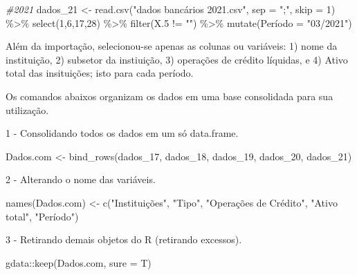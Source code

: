 \documentclass[
]{article}
\newenvironment{Shaded}{\begin{snugshade}}{\end{snugshade}}
\newcommand{\AttributeTok}[1]{\textcolor[rgb]{0.77,0.63,0.00}{#1}}
\newcommand{\CommentTok}[1]{\textcolor[rgb]{0.56,0.35,0.01}{\textit{#1}}}
\newcommand{\DecValTok}[1]{\textcolor[rgb]{0.00,0.00,0.81}{#1}}
\newcommand{\FloatTok}[1]{\textcolor[rgb]{0.00,0.00,0.81}{#1}}
\newcommand{\FunctionTok}[1]{\textcolor[rgb]{0.00,0.00,0.00}{#1}}
\newcommand{\NormalTok}[1]{#1}
\newcommand{\OtherTok}[1]{\textcolor[rgb]{0.56,0.35,0.01}{#1}}
\newcommand{\SpecialCharTok}[1]{\textcolor[rgb]{0.00,0.00,0.00}{#1}}
\newcommand{\StringTok}[1]{\textcolor[rgb]{0.31,0.60,0.02}{#1}}
\begin{document}
\begin{Shaded}
\begin{Highlighting}[]
\CommentTok{\#2021}
\NormalTok{dados\_21 }\OtherTok{\textless{}{-}} \FunctionTok{read.csv}\NormalTok{(}\StringTok{"dados bancários 2021.csv"}\NormalTok{, }\AttributeTok{sep =} \StringTok{";"}\NormalTok{, }\AttributeTok{skip =} \DecValTok{1}\NormalTok{) }\SpecialCharTok{\%\textgreater{}\%} 
  \FunctionTok{select}\NormalTok{(}\DecValTok{1}\NormalTok{,}\DecValTok{6}\NormalTok{,}\DecValTok{17}\NormalTok{,}\DecValTok{28}\NormalTok{) }\SpecialCharTok{\%\textgreater{}\%} \FunctionTok{filter}\NormalTok{(X}\FloatTok{.5} \SpecialCharTok{!=} \StringTok{""}\NormalTok{) }\SpecialCharTok{\%\textgreater{}\%} \FunctionTok{mutate}\NormalTok{(Período }\OtherTok{=} \StringTok{"03/2021"}\NormalTok{)}
\end{Highlighting}
\end{Shaded}

Além da importação, selecionou-se apenas as colunas ou variáveis: 1)
nome da instituição, 2) subsetor da instiuição, 3) operações de crédito
líquidas, e 4) Ativo total das insituições; isto para cada período.

Os comandos abaixos organizam os dados em uma base consolidada para sua
utilização.

1 - Consolidando todos os dados em um só data.frame.

\begin{Shaded}
\begin{Highlighting}[]
\NormalTok{Dados.com }\OtherTok{\textless{}{-}} \FunctionTok{bind\_rows}\NormalTok{(dados\_17, dados\_18, dados\_19, dados\_20, dados\_21)}
\end{Highlighting}
\end{Shaded}

2 - Alterando o nome das variáveis.

\begin{Shaded}
\begin{Highlighting}[]
\FunctionTok{names}\NormalTok{(Dados.com) }\OtherTok{\textless{}{-}} \FunctionTok{c}\NormalTok{(}\StringTok{"Instituições"}\NormalTok{, }
                      \StringTok{"Tipo"}\NormalTok{, }
                      \StringTok{"Operações de Crédito"}\NormalTok{,}
                      \StringTok{"Ativo total"}\NormalTok{, }
                      \StringTok{"Período"}\NormalTok{)}
\end{Highlighting}
\end{Shaded}

3 - Retirando demais objetos do R (retirando excessos).

\begin{Shaded}
\begin{Highlighting}[]
\NormalTok{gdata}\SpecialCharTok{::}\FunctionTok{keep}\NormalTok{(Dados.com, }\AttributeTok{sure =}\NormalTok{ T)}
\end{Highlighting}
\end{Shaded}
\end{document}
